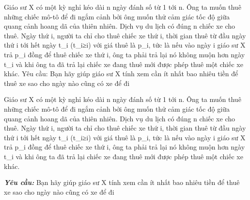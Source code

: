 Giáo sư X có một kỳ nghỉ kéo dài n ngày đánh số từ 1 tới n. Ông ta muốn thuê những chiếc mô-tô để đi ngắm cảnh bởi ông muốn thử cảm giác tốc độ giữa quang cảnh hoang dã của thiên nhiên. Dịch vụ du lịch có đúng n chiếc xe cho thuê. Ngày thứ i, người ta chỉ cho thuê chiếc xe thứ i, thời gian thuê từ đầu ngày thứ i tới hết ngày t\_i (t\_i≥i) với giá thuê là p\_i, tức là nếu vào ngày i giáo sư X trả p\_i đồng để thuê chiếc xe thứ i, ông ta phải trả lại nó không muộn hơn ngày t\_i và khi ông ta đã trả lại chiếc xe đang thuê mới được phép thuê một chiếc xe khác.       Yêu cầu: Bạn hãy giúp giáo sư X tính xem cần ít nhất bao nhiêu tiền để thuê xe sao cho ngày nào cũng có xe để đi    



   Giáo sư X có một kỳ nghỉ kéo dài n ngày đánh số từ 1 tới n. Ông ta muốn thuê những chiếc mô-tô để đi ngắm cảnh bởi ông muốn thử cảm giác tốc độ giữa quang cảnh hoang dã của thiên nhiên. Dịch vụ du lịch có đúng n chiếc xe cho thuê. Ngày thứ i, người ta chỉ cho thuê chiếc xe thứ i, thời gian thuê từ đầu ngày thứ i tới hết ngày t\_i (t\_i≥i) với giá thuê là p\_i, tức là nếu vào ngày i giáo sư X trả p\_i đồng để thuê chiếc xe thứ i, ông ta phải trả lại nó không muộn hơn ngày t\_i và khi ông ta đã trả lại chiếc xe đang thuê mới được phép thuê một chiếc xe khác.  

\textbf{\emph{     Yêu cầu:    }}   Bạn hãy giúp giáo sư X tính xem cần ít nhất bao nhiêu tiền để thuê xe sao cho ngày nào cũng có xe để đi
